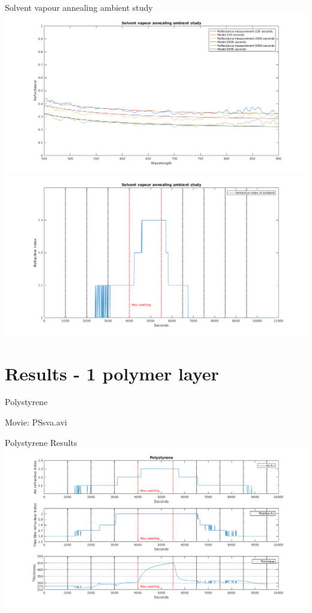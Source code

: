 \documentclass[10pt]{beamer}
\begin{document}
\begin{frame}{Solvent vapour annealing ambient study}
\centering
\includegraphics[height=0.35\textheight]{ambientreflectancestep.png}
\includegraphics[height=0.35\textheight]{ambientstudyrefr.png}
\end{frame}


	\section{Results - 1 polymer layer}

\begin{frame}{Polystyrene}
\begin{center}
\Huge Movie: PSsva.avi
\end{center}
\end{frame}

\begin{frame}{Polystyrene Results}
\includegraphics[width=\textwidth]{PSswelling1.png}
\end{frame}
\end{document}
